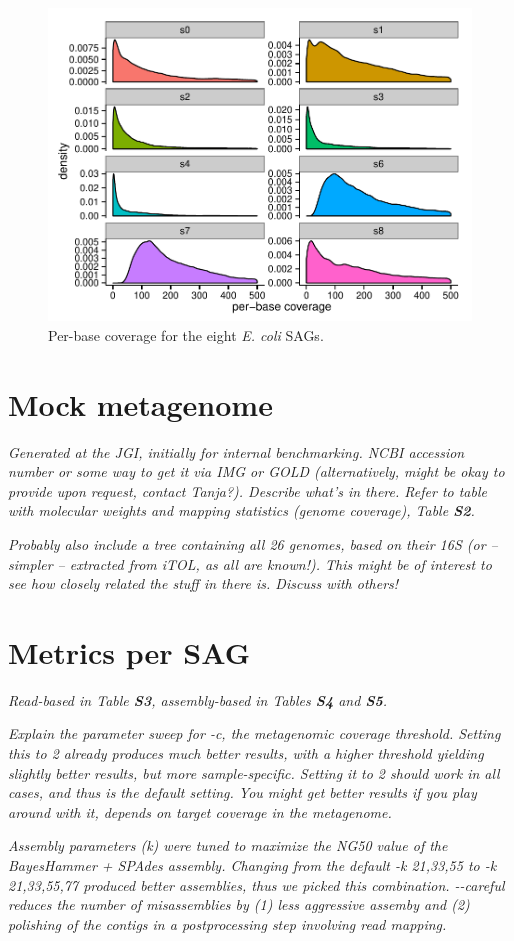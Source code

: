 \documentclass{bioinfo2}
\begin{document}
\begin{figure}[h]
\centering
\includegraphics[width=.5\textwidth]{sag_depth}
\caption{Per-base coverage for the eight \textit{E. coli} SAGs.}
\end{figure}

\section{Mock metagenome}

\textit{Generated at the JGI, initially for internal benchmarking. NCBI accession number or some way to get it via IMG or GOLD (alternatively, might be okay to provide upon request, contact Tanja?). Describe what's in there. Refer to table with molecular weights and mapping statistics (genome coverage), Table \textbf{S2}.}

\textit{Probably also include a tree containing all 26 genomes, based on their 16S (or -- simpler -- extracted from iTOL, as all are known!). This might be of interest to see how closely related the stuff in there is. Discuss with others!}

\section{Metrics per SAG}

\textit{Read-based in Table \textbf{S3}, assembly-based in Tables \textbf{S4} and \textbf{S5}.}

\textit{Explain the parameter sweep for -c, the metagenomic coverage threshold. Setting this to 2 already produces much better results, with a higher threshold yielding slightly better results, but more sample-specific. Setting it to 2 should work in all cases, and thus is the default setting. You might get better results if you play around with it, depends on target coverage in the metagenome.}

\textit{Assembly parameters (k) were tuned to maximize the NG50 value of the BayesHammer + SPAdes assembly. Changing from the default -k 21,33,55 to -k 21,33,55,77 produced better assemblies, thus we picked this combination. -{}-careful reduces the number of misassemblies by (1) less aggressive assemby and (2) polishing of the contigs in a postprocessing step involving read mapping.}
\end{document}
